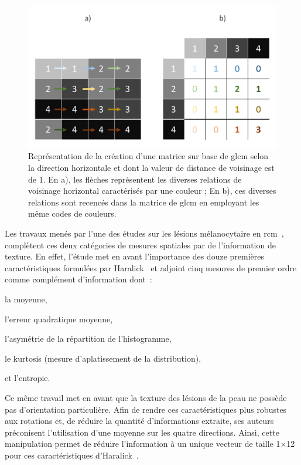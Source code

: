 \begin{figure}[H]
    \centering
    \includegraphics[width=\linewidth]{contents/chapter_5/resources/scheme_principle_GLCM.pdf}
    \caption{Représentation de la création d'une matrice sur base de \gls{glcm} selon la direction horizontale et dont la valeur de distance de voisinage est de 1. En a), les flèches représentent les diverses relations de voisinage horizontal caractérisés par une couleur ; En b), ces diverses relations sont recencés dans la matrice de \gls{glcm} en employant les même codes de couleurs.}
    \label{fig:scheme_principle_GLCM}
\end{figure}\par

Les travaux menés par l'une des études sur les lésions mélanocytaire en \gls{rcm}~\cite{Wiltgen2008}, complètent ces deux catégories de mesures spatiales par de l'information de texture. En effet, l'étude met en avant l'importance des douze premières caractéristiques formulées par Haralick~\cite{Haralick1973} et adjoint cinq mesures de premier ordre comme complément d'information dont~:
\begin{inlinerate}
    \item la moyenne,
    \item l'erreur quadratique moyenne,
    \item l'asymétrie de la répartition de l'histogramme,
    \item le kurtosis (mesure d'aplatissement de la distribution),
    \item et l'entropie.
\end{inlinerate}
Ce même travail met en avant que la texture des lésions de la peau ne possède pas d'orientation particulière. Afin de rendre ces caractéristiques plus robustes aux rotations et, de réduire la quantité d'informations extraite, ses auteurs préconisent l'utilisation d'une moyenne sur les quatre directions. Ainsi, cette manipulation permet de réduire l'information à un unique vecteur de taille 1$\times$12 pour ces caractéristiques d'Haralick~\cite{Wiltgen2008}.\par

